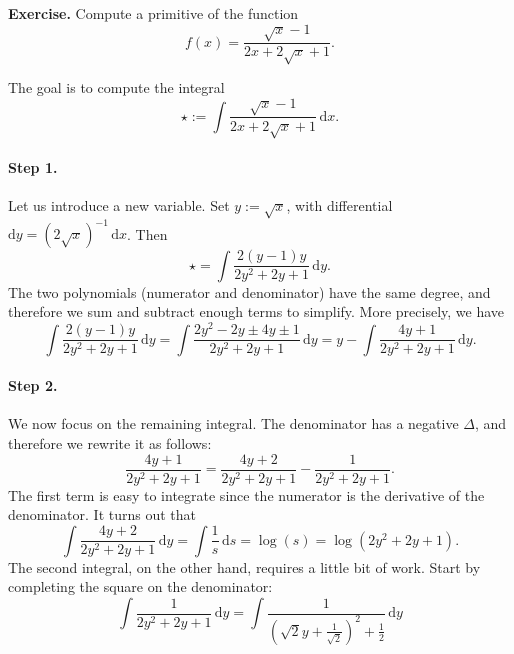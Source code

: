 \documentclass[a4paper,10 pt]{report}
\theoremstyle{definition}
\begin{document}
\begin{exerciseBox} \textbf{Exercise.} Compute a primitive of the function
\begin{equation*} f(x) = \frac{\sqrt{x} - 1}{2x + 2 \sqrt{x} + 1}. \end{equation*} \end{exerciseBox}

\begin{solutionBox} The goal is to compute the integral
\begin{equation*} \star := \int \frac{\sqrt{x} - 1}{2x + 2 \sqrt{x} + 1} \, \mathrm{d}x. \end{equation*}

\paragraph{Step 1.} Let us introduce a new variable. Set $y := \sqrt{x}$, with differential $\mathrm{d}y = (2 \sqrt{x})^{-1} \, \mathrm{d}x$. Then
\begin{equation*} \star = \int \frac{ 2(y - 1)y }{2y^2 + 2y + 1} \, \mathrm{d}y. \end{equation*}
The two polynomials (numerator and denominator) have the same degree, and therefore we sum and subtract enough terms to simplify. More precisely, we have
\begin{equation*} \int \frac{ 2(y - 1)y }{2y^2 + 2y + 1} \, \mathrm{d}y = \int \frac{ 2y^2 - 2y \pm 4y \pm 1 }{2y^2 + 2y + 1} \, \mathrm{d}y = y - \int \frac{4y + 1}{2y^2 + 2y + 1} \, \mathrm{d}y. \end{equation*}

\paragraph{Step 2.} We now focus on the remaining integral. The denominator has a negative $\Delta$, and therefore we rewrite it as follows:
\begin{equation*}   \frac{4y + 1}{2y^2 + 2y + 1} = \frac{4y + 2}{2y^2 + 2y + 1} - \frac{1}{2y^2 + 2y + 1}. \end{equation*}
The first term is easy to integrate since the numerator is the derivative of the denominator. It turns out that
\begin{equation*}\int \frac{4y + 2}{2y^2 + 2y + 1} \, \mathrm{d}y = \int \frac{1}{s} \, \mathrm{d}s = \log(s) = \log(2y^2 + 2y + 1). \end{equation*}
The second integral, on the other hand, requires a little bit of work. Start by completing the square on the denominator:
\begin{equation*} \int \frac{1}{2y^2 + 2y + 1} \, \mathrm{d}y = \int \frac{1}{\left( \sqrt{2}y + \frac{1}{\sqrt{2}} \right)^2 + \frac{1}{2}} \, \mathrm{d}y \end{equation*}


\end{solutionBox}
\end{document}
